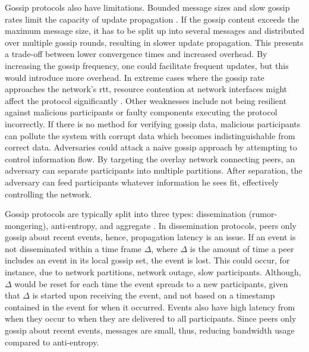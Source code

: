 \documentclass[USenglish]{uit-thesis}
\begin{document}

Gossip protocols also have limitations.
Bounded message sizes and slow gossip rates limit the capacity of update propagation \cite{gossip_promise}.
If the gossip content exceeds the maximum message size, it has to be split up into several messages and distributed over multiple gossip rounds, resulting in slower update propagation.
This presents a trade-off between lower convergence times and increased overhead.
By increasing the gossip frequency, one could facilitate frequent updates, but this would introduce more overhead.
In extreme cases where the gossip rate approaches the network's \gls{rtt}, resource contention at network interfaces might affect the protocol significantly \cite{gossip_promise}.
Other weaknesses include not being resilient against malicious participants or faulty components executing the protocol incorrectly.
If there is no method for verifying gossip data, malicious participants can pollute the system with corrupt data which becomes indistinguishable from correct data. 
Adversaries could attack a naive gossip approach by attempting to control information flow.
By targeting the overlay network connecting peers, an adversary can separate participants into multiple partitions.
After separation, the adversary can feed participants whatever information he sees fit, effectively controlling the network.

Gossip protocols are typically split into three types: dissemination (rumor-mongering), anti-entropy, and aggregate \cite{gossip_promise}.
In dissemination protocols, peers only gossip about recent events, hence, propagation latency is an issue.
If an event is not disseminated within a time frame $\Delta$, where $\Delta$ is the amount of time a peer includes an event in its local gossip set, the event is lost.
This could occur, for instance, due to network partitions, network outage, slow participants.
Although, $\Delta$ would be reset for each time the event spreads to a new participants, given that $\Delta$ is started upon receiving the event, and not based on a timestamp contained in the event for when it occurred. 
Events also have high latency from when they occur to when they are delivered to all participants.
Since peers only gossip about recent events, messages are small, thus, reducing bandwidth usage compared to anti-entropy.
\end{document}
